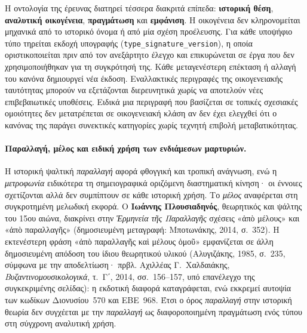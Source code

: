 \documentclass[11pt,a4paper]{article}
\begin{document}
Η οντολογία της έρευνας διατηρεί τέσσερα διακριτά επίπεδα: \textbf{ιστορική θέση}, \textbf{αναλυτική οικογένεια}, \textbf{πραγμάτωση} και \textbf{εμφάνιση}. Η οικογένεια δεν κληρονομείται μηχανικά από το ιστορικό όνομα ή από μία σχέση προέλευσης. Για κάθε υποψήφιο τύπο τηρείται εκδοχή υπογραφής (\texttt{type\_signature\_version}), η οποία οριστικοποιείται πριν από τον ανεξάρτητο έλεγχο και επικυρώνεται σε έργα που δεν χρησιμοποιήθηκαν για τη συγκρότησή της. Κάθε μεταγενέστερη επέκταση ή αλλαγή του κανόνα δημιουργεί νέα έκδοση. Εναλλακτικές περιγραφές της οικογενειακής ταυτότητας μπορούν να εξετάζονται διερευνητικά χωρίς να αποτελούν νέες επιβεβαιωτικές υποθέσεις. Ειδικά μια περιγραφή που βασίζεται σε τοπικές σχεσιακές ομοιότητες δεν μετατρέπεται σε οικογενειακή κλάση αν δεν έχει ελεγχθεί ότι ο κανόνας της παράγει συνεκτικές κατηγορίες χωρίς τεχνητή επιβολή μεταβατικότητας.

\paragraph{Παραλλαγή, μέλος και ειδική χρήση των ενδιάμεσων μαρτυριών.}
Η ιστορική ψαλτική \emph{παραλλαγή} αφορά φθογγική και τροπική ανάγνωση, ενώ η \emph{μετροφωνία} ειδικότερα τη σημειογραφικά οριζόμενη διαστηματική κίνηση· οι έννοιες σχετίζονται αλλά δεν συμπίπτουν σε κάθε ιστορική χρήση. Το \emph{μέλος} αναφέρεται στη συγκροτημένη μελωδική εκφορά. Ο \textbf{Ιωάννης Πλουσιαδηνός}, θεωρητικός και ψάλτης του 15ου αιώνα, διακρίνει στην \emph{Ἑρμηνεία τῆς Παραλλαγῆς} σχέσεις «ἀπὸ μέλους» και «ἀπὸ παραλλαγῆς» (δημοσιευμένη μεταγραφή: Μποτωνάκης, 2014, σ.~352). Η εκτενέστερη φράση «ἀπὸ παραλλαγῆς καὶ μέλους ὁμοῦ» εμφανίζεται σε άλλη δημοσιευμένη απόδοση του ίδιου θεωρητικού υλικού (Αλυγιζάκης, 1985, σ.~235, σύμφωνα με την αποδελτίωση· πρβλ. Αχιλλέας Γ.~Χαλδαιάκης, \emph{Βυζαντινομουσικολογικά}, τ.~Γ΄, 2014, σσ.~156--157, υπό επανέλεγχο της συγκεκριμένης σελίδας): η εκδοτική διαφορά καταγράφεται, ενώ εκκρεμεί αυτοψία των κωδίκων Διονυσίου~570 και ΕΒΕ~968. Έτσι ο όρος \emph{παραλλαγή} στην ιστορική θεωρία δεν συγχέεται με την \emph{παραλλαγή} ως διαφοροποιημένη πραγμάτωση ενός τύπου στη σύγχρονη αναλυτική χρήση.
\end{document}

